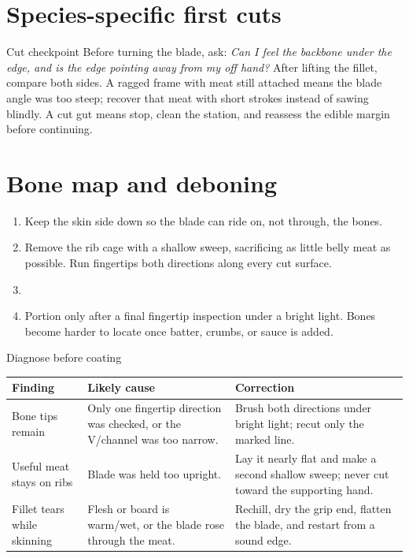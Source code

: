 \section{Species-specific first cuts}
\FilletMethod
\FilletPlate
\begin{telospanel}{Cut checkpoint}
Before turning the blade, ask: \emph{Can I feel the backbone under the edge,
and is the edge pointing away from my off hand?} After lifting the fillet,
compare both sides. A ragged frame with meat still attached means the blade
angle was too steep; recover that meat with short strokes instead of sawing
blindly. A cut gut means stop, clean the station, and reassess the edible
margin before continuing.
\end{telospanel}

\ifdefempty{\FilletPlate}{}{\newpage}
\section{Bone map and deboning}
\BoneDiagram

\begin{enumerate}
\item Keep the skin side down so the blade can ride on, not through, the bones.
\item Remove the rib cage with a shallow sweep, sacrificing as little belly
meat as possible. Run fingertips both directions along every cut surface.
\item \Debone
\item Portion only after a final fingertip inspection under a bright light.
Bones become harder to locate once batter, crumbs, or sauce is added.
\end{enumerate}

\newpage
\begin{teloscard}{Diagnose before coating}
\begin{tabularx}{\linewidth}{@{}p{.25\linewidth}LL@{}}
\toprule
\textbf{Finding} & \textbf{Likely cause} & \textbf{Correction}\\
\midrule
Bone tips remain & Only one fingertip direction was checked, or the V/channel
was too narrow. & Brush both directions under bright light; recut only the
marked line.\\
Useful meat stays on ribs & Blade was held too upright. & Lay it nearly flat
and make a second shallow sweep; never cut toward the supporting hand.\\
Fillet tears while skinning & Flesh or board is warm/wet, or the blade rose
through the meat. & Rechill, dry the grip end, flatten the blade, and restart
from a sound edge.\\
\bottomrule
\end{tabularx}
\end{teloscard}

